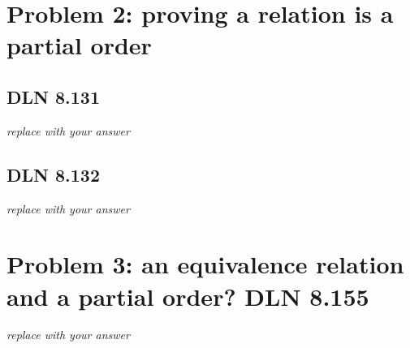 \documentclass[titlepage]{article}
\begin{document}
\section{Problem 2: proving a relation is a partial order}

\subsection{DLN 8.131}

\emph{replace with your answer}

\subsection{DLN 8.132}

\emph{replace with your answer}

\section{Problem 3: an equivalence relation and a partial order? DLN 8.155}

\emph{replace with your answer}
\end{document}
